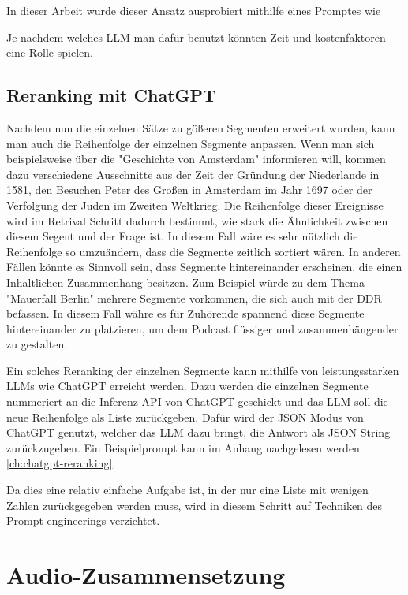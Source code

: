 
In dieser Arbeit wurde dieser Ansatz ausprobiert mithilfe eines Promptes wie 

Je nachdem welches LLM man dafür benutzt könnten Zeit und kostenfaktoren eine Rolle spielen.


\subsection{Reranking mit ChatGPT}

Nachdem nun die einzelnen Sätze zu gößeren Segmenten erweitert wurden, kann man auch die Reihenfolge der einzelnen Segmente anpassen.
Wenn man sich beispielsweise über die "Geschichte von Amsterdam" informieren will, kommen dazu verschiedene Ausschnitte aus der Zeit der Gründung der Niederlande in 1581, den Besuchen Peter des Großen in Amsterdam im Jahr 1697 oder der Verfolgung der Juden im Zweiten Weltkrieg.
Die Reihenfolge dieser Ereignisse wird im Retrival Schritt dadurch bestimmt, wie stark die Ähnlichkeit zwischen diesem Segent und der Frage ist.
In diesem Fall wäre es sehr nützlich die Reihenfolge so umzuändern, dass die Segmente zeitlich sortiert wären.
In anderen Fällen könnte es Sinnvoll sein, dass Segmente hintereinander erscheinen, die einen Inhaltlichen Zusammenhang besitzen.
Zum Beispiel würde zu dem Thema "Mauerfall Berlin" mehrere Segmente vorkommen, die sich auch mit der DDR befassen.
In diesem Fall währe es für Zuhörende spannend diese Segmente hintereinander zu platzieren, um dem Podcast flüssiger und zusammenhängender zu gestalten.

Ein solches Reranking der einzelnen Segmente kann mithilfe von leistungsstarken LLMs wie ChatGPT erreicht werden.
Dazu werden die einzelnen Segmente nummeriert an die Inferenz API von ChatGPT geschickt und das LLM soll die neue Reihenfolge als Liste zurückgeben.
Dafür wird der JSON Modus von ChatGPT genutzt, welcher das LLM dazu bringt, die Antwort als JSON String zurückzugeben.
Ein Beispielprompt kann im Anhang nachgelesen werden \autoref{ch:chatgpt-reranking}.

Da dies eine relativ einfache Aufgabe ist, in der nur eine Liste mit wenigen Zahlen zurückgegeben werden muss, wird in diesem Schritt auf Techniken des Prompt engineerings verzichtet.

\section{Audio-Zusammensetzung}


